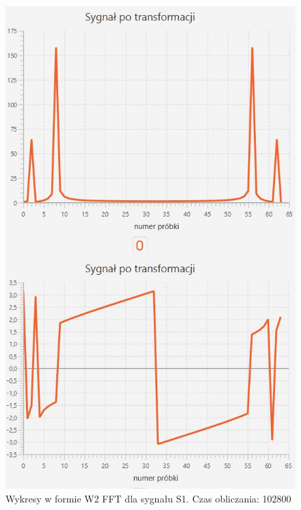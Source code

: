 \documentclass[12pt]{article}
\begin{document}
\begin{figure}[H]
	\centering
	\includegraphics[width=.8\linewidth]{FFT-S1-W2}
	\caption{Wykresy w formie W2 FFT dla sygnału S1. Czas obliczania: 102800}
	\label{S3_sygnal}
\end{figure}
\end{document}
